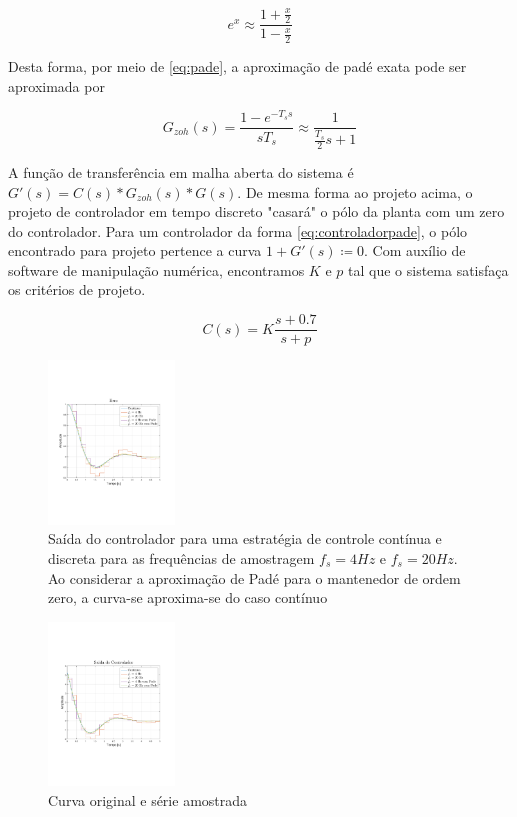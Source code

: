 \documentclass[twoside, fleqn]{article}
\begin{document}
    \begin{equation}
    e^{x} \approx \frac{1 + \frac{x}{2}}{1 - \frac{x}{2}}
    \label{eq:pade}
    \end{equation}
    
    Desta forma, por meio de \eqref{eq:pade}, a aproximação de padé exata pode ser aproximada por
    
    \begin{equation}
    G_{zoh}(s) = \frac{1 - e^{-T_s s}}{s T_s} \approx \frac{1}{\frac{T_s}{2} s + 1}
    \end{equation}
    
    A função de transferência em malha aberta do sistema é $G'(s) = C(s)*G_{zoh}(s)*G(s)$. De mesma forma ao projeto acima, o projeto de controlador em tempo discreto "casará" o pólo da planta com um zero do controlador. Para um controlador da forma \eqref{eq:controladorpade}, o pólo encontrado para projeto pertence a curva $1 + G'(s) \coloneqq 0$.   Com auxílio de software de manipulação numérica, encontramos $K$ e $p$ tal que o sistema satisfaça os critérios de  projeto. 

    \begin{equation}
    \label{eq:controladorpade}
        C(s) = K \frac{s + 0.7}{s + p}
    \end{equation}
    
    \begin{figure}[H]
	\center
	\includegraphics[trim=200 200 200 200, width=0.3\textwidth]{./images/saidazoh.pdf}
	\caption{Saída do controlador para uma estratégia de controle contínua e discreta para as frequências de amostragem $f_s = 4 Hz$ e $f_s = 20 Hz$. Ao considerar a aproximação de Padé para o mantenedor de ordem zero, a curva-se aproxima-se do caso contínuo }
	\label{fig:ex6controle}
    \end{figure}
    
    \begin{figure}[H]
	\center
	\includegraphics[trim=200 200 200 200, width=0.3\textwidth]{./images/controlezoh.pdf}
	\caption{Curva original e série amostrada}
	\label{fig:ex6saida}
    \end{figure}
    
\end{document}
